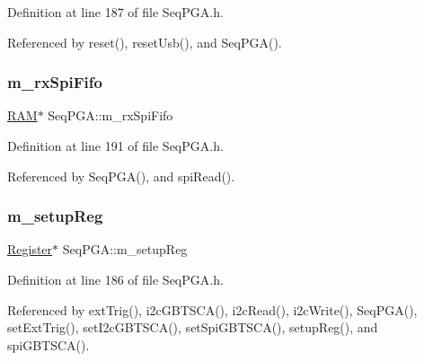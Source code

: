 Definition at line 187 of file Seq\+P\+G\+A.\+h.



Referenced by reset(), reset\+Usb(), and Seq\+P\+G\+A().

\mbox{\label{classSeqPGA_a8ebfe7863e10ab540b5ebecb7655a0d5}} 
\subsubsection{\texorpdfstring{m\+\_\+rx\+Spi\+Fifo}{m\_rxSpiFifo}}
{\footnotesize\ttfamily \hyperlink{classRAM}{R\+AM}$\ast$ Seq\+P\+G\+A\+::m\+\_\+rx\+Spi\+Fifo\hspace{0.3cm}{\ttfamily [private]}}



Definition at line 191 of file Seq\+P\+G\+A.\+h.



Referenced by Seq\+P\+G\+A(), and spi\+Read().

\mbox{\label{classSeqPGA_a03269241e7fc26493cd0595beda334c2}} 
\subsubsection{\texorpdfstring{m\+\_\+setup\+Reg}{m\_setupReg}}
{\footnotesize\ttfamily \hyperlink{classRegister}{Register}$\ast$ Seq\+P\+G\+A\+::m\+\_\+setup\+Reg\hspace{0.3cm}{\ttfamily [private]}}



Definition at line 186 of file Seq\+P\+G\+A.\+h.



Referenced by ext\+Trig(), i2c\+G\+B\+T\+S\+C\+A(), i2c\+Read(), i2c\+Write(), Seq\+P\+G\+A(), set\+Ext\+Trig(), set\+I2c\+G\+B\+T\+S\+C\+A(), set\+Spi\+G\+B\+T\+S\+C\+A(), setup\+Reg(), and spi\+G\+B\+T\+S\+C\+A().

\mbox{\label{classSeqPGA_afd5442d9b92f9b59bd553df9bd91dd87}} 
